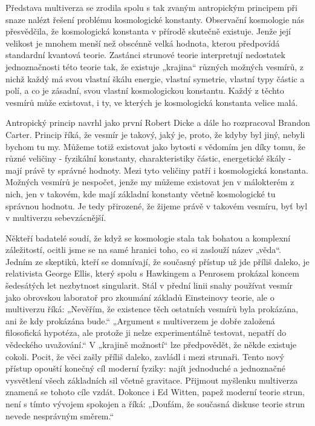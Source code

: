   Představa multiverza se zrodila spolu s tak zvaným antropickým principem při snaze nalézt řešení
  problému kosmologické konstanty. Observační kosmologie nás přesvědčila, že kosmologická konstanta
  v přírodě skutečně existuje. Jenže její velikost je mnohem menší než obscénně velká hodnota,
  kterou předpovídá standardní kvantová teorie. Zastánci strunové teorie interpretují nedostatek
  jednoznačnosti této teorie tak, že existuje „krajina“ různých možných vesmírů, z nichž každý má
  svou vlastní škálu energie, vlastní symetrie, vlastní typy částic a polí, a co je zásadní, svou
  vlastní kosmologickou konstantu. Každý z těchto vesmírů může existovat, i ty, ve kterých je
  kosmologická konstanta velice malá. 
  
  Antropický princip navrhl jako první Robert Dicke a dále ho rozpracoval Brandon Carter. Princip
  říká, že vesmír je takový, jaký je, proto, že kdyby byl jiný, nebyli bychom tu my. Můžeme totiž
  existovat jako bytosti s vědomím jen díky tomu, že různé veličiny - fyzikální konstanty,
  charakteristiky částic, energetické škály - mají právě ty správné hodnoty. Mezi tyto veličiny
  patří i kosmologická konstanta. Možných vesmírů je nespočet, jenže my můžeme existovat jen v
  málokterém z nich, jen v takovém, kde mají základní konstanty včetně kosmologické tu správnou
  hodnotu. Je tedy přirozené, že žijeme právě v takovém vesmíru, byť byl v multiverzu sebevzácnější.
  
  Někteří badatelé soudí, že když se kosmologie stala tak bohatou a komplexní záležitostí, ocitli
  jsme se na samé hranici toho, co si zaslouží název „věda“. Jedním ze skeptiků, kteří se domnívají,
  že současný přístup už jde příliš daleko, je relativista George Ellis, který spolu s Hawkingem a
  Penrosem prokázal koncem šedesátých let nezbytnost singularit. Stál v přední linii snahy používat
  vesmír jako obrovskou laboratoř pro zkoumání základů Einsteinovy teorie, ale o multiverzu říká:
  „Nevěřím, že existence těch ostatních vesmírů byla prokázána, ani že kdy prokázána bude.“
  „Argument s multiverzem je dobře založená filosofická hypotéza, ale protože ji nelze
  experimentálně testovat, nepatří do vědeckého uvažování.“ V „krajině možností“ lze předpovědět, že
  někde existuje cokoli. Pocit, že věci zašly příliš daleko, zavládl i mezi strunaři. Tento nový
  přístup opouští konečný cíl moderní fyziky: najít jednoduché a jednoznačné vysvětlení všech
  základních sil včetně gravitace. Přijmout myšlenku multiverza znamená se tohoto cíle vzdát.
  Dokonce i Ed Witten, papež moderní teorie strun, není s tímto vývojem spokojen a říká: „Doufám, že
  současná diskuse teorie strun nevede nesprávným směrem.“
  
